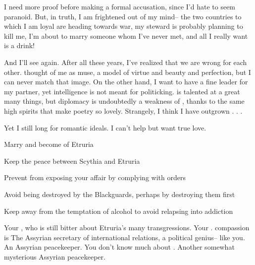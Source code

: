 \documentclass[char]{Kos}
\begin{document}
I need more proof before making a formal accusation, since I'd hate to seem paranoid. But, in truth, I am frightened out of my mind-- the two countries to which I am loyal are heading towards war, my steward is probably planning to kill me, I'm about to marry someone whom I've never met, and all I really want is a drink!

And I'll see \cPoet{} again. After all these years, I've realized that we are wrong for each other. \cPoet{\They} thought of me as \cPoet{\their} muse, a model of virtue and beauty and perfection, but I can never match that image. On the other hand, I want to have a fine leader for my partner, yet \cPoet{\their} intelligence is not meant for politicking. \cPoet{\They} is talented at a great many things, but diplomacy is undoubtedly a weakness of \cPoet{\theirs}, thanks to the same high spirits that make \cPoet{\their} poetry so lovely. Strangely, I think I have outgrown \cPoet{\them} . . .

Yet I still long for \cPoet{\their} romantic ideals. I can't help but want true love.

\begin{itemz}[Goals]
 \item Marry \cGroom{} and become \cBride{\prince} of Etruria
 \item Keep the peace between Scythia and Etruria
 \item Prevent \cEtruriaKing{} from exposing your affair by complying with \cEtruriaKing{\their} orders
 \item Avoid being destroyed by the Blackguards, perhaps by destroying them first
 \item Keep away from the temptation of alcohol to avoid relapsing into addiction
\end{itemz}

\begin{contacts}
\contact{\cScythiaQueen{}} Your \cScythiaQueen{\parent}, who is still bitter about Etruria's many transgressions. 
\contact{\cScythiaKing{}} Your \cScythiaKing{\parent}. \cScythiaKing{\Their} compassion is 
 The Assyrian secretary of international relations, a political genius-- like you.
\contact{\cAnarchist{}} An Assyrian peacekeeper. You don't know much about \cAnarchist{\them}.
\contact{\cArchaeologist{}} Another somewhat mysterious Assyrian peacekeeper.
\end{contacts}
\end{document}
